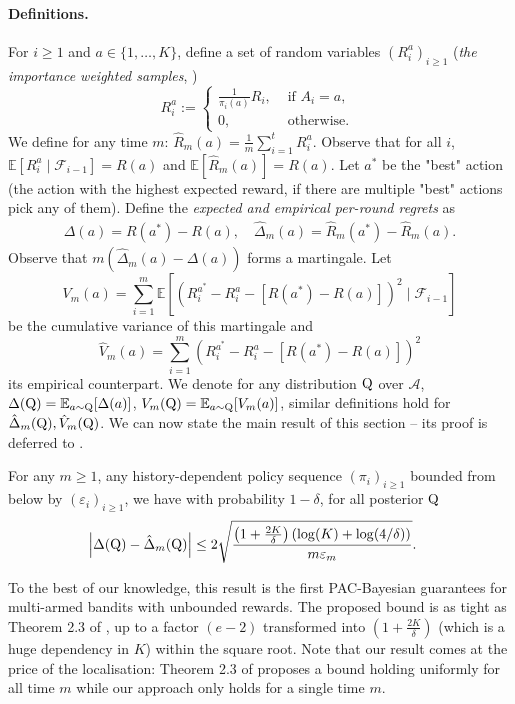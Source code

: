 \paragraph{Definitions.}
For $i \geq 1$ and $a \in\{1, \ldots, K\}$, define a set of random variables $(R_i^a)_{i\geq 1}$ (\emph{the importance weighted samples}, \citealp{sutton2018reinforcement})
$$
R_i^a:=\left\{\begin{array}{cl}
\frac{1}{\pi_i(a)} R_i, & \text { if } A_i=a, \\
0, & \text { otherwise. }
\end{array}\right.
$$
We define for any time $m$:
$
\hat{R}_m(a)=\frac{1}{m} \sum_{i=1}^t R_i^a .
$
Observe that for all $i$, $\mathbb{E}\left[R_i^a \mid \mathcal{F}_{i-1}\right]=R(a)$ and $\mathbb{E}[\hat{R}_m(a)]=R(a)$.
Let $a^*$ be the "best" action (the action with the highest expected reward, if there are multiple "best" actions pick any of them). Define the \emph{expected and empirical per-round regrets} as
$$
\begin{aligned}
\Delta(a) =R\left(a^*\right)-R(a), \quad \hat{\Delta}_m(a) =\hat{R}_m\left(a^*\right)-\hat{R}_m(a) .
\end{aligned}
$$
Observe that $m\left(\hat{\Delta}_m(a)-\Delta(a)\right)$ forms a martingale. Let
$$
V_m(a)=\sum_{i=1}^m \mathbb{E}\left[\left(R_i^{a^*}-R_i^a-\left[R\left(a^*\right)-R(a)\right]\right)^2 \mid \mathcal{F}_{i-1}\right]
$$
be the cumulative variance of this martingale and
$$
\hat{V}_m(a)=\sum_{i=1}^m \left(R_i^{a^*}-R_i^a-\left[R\left(a^*\right)-R(a)\right]\right)^2
$$
its empirical counterpart. We denote for any distribution $\mathrm{Q}$ over $\mathcal{A}$, $\Delta(\mathrm{Q}) = \mathbb{E}_{a\sim \mathrm{Q}}[\Delta(a)]$, $V_m(\mathrm{Q})= \mathbb{E}_{a\sim \mathrm{Q}}[V_m(a)]$, similar definitions hold for $\hat{\Delta}_m(\mathrm{Q}),\hat{V}_m(\mathrm{Q})$.
We can now state the main result of this section -- its proof is deferred to .

\begin{theorem}
\label{th: bandits_bound}
For any $m\geq 1$, any history-dependent policy sequence $(\pi_i)_{i\geq 1}$ bounded from below by $(\varepsilon_i)_{i\geq 1}$, we have with probability $1-\delta$, for all posterior $\mathrm{Q}$
\begin{align*}
\left| \Delta(\mathrm{Q}) - \hat{\Delta}_m(\mathrm{Q})  \right| & \leq 2\sqrt{\frac{\left(1+ \frac{2K}{\delta} \right)\left( \log(K) + \log(4/\delta) \right)}{ m \varepsilon_m}}.
\end{align*}
\end{theorem}
To the best of our knowledge, this result is the first PAC-Bayesian guarantees for multi-armed bandits with unbounded rewards. The proposed bound is as tight as Theorem 2.3 of \citet{seldin2012bandit}, up to a factor $(e-2)$ transformed into $\left(1+ \frac{2K}{\delta}\right)$ (which is a huge dependency in $K$) within the square root.
Note that our result comes at the price of the localisation: Theorem 2.3 of \citet{seldin2012bandit} proposes a bound holding uniformly for all time $m$ while our approach only holds for a single time $m$.


